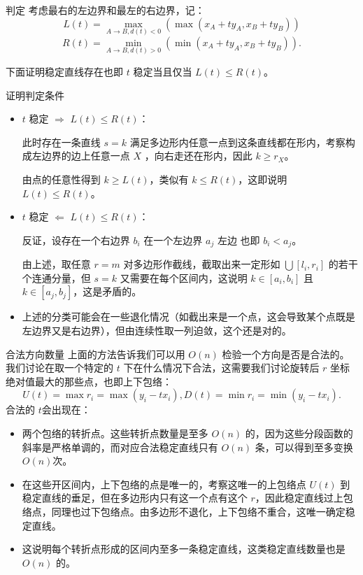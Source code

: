 \documentclass{beamer}
\begin{document}
{{\begin{frame}{判定}
  考虑最右的左边界和最左的右边界，记：
  \[
    L(t) = \max_{A \rightarrow B, d(t) < 0}(\max(x_A + ty_A, x_B + ty_B)) 
  \]
  \[
    R(t) = \min_{A \rightarrow B, d(t) > 0}(\min(x_A + ty_A, x_B + ty_B)).
  \]

  下面证明稳定直线存在也即 $t$ 稳定当且仅当 $L(t) \le R(t)$。
\end{frame}

\begin{frame}{证明判定条件}
  \begin{itemize}
    \item $t$ 稳定 $\Rightarrow$ $L(t) \le R(t)$：

    此时存在一条直线 $s = k$ 满足多边形内任意一点到这条直线都在形内，考察构成左边界的边上任意一点 $X$ ，向右走还在形内，因此 $k \ge r_X$。
    
    由点的任意性得到 $k \ge L(t)$，类似有 $k \le R(t)$，这即说明 $L(t) \le R(t)$。
    \item $t$ 稳定 $\Leftarrow$ $L(t) \le R(t)$：
   
     反证，设存在一个右边界 $b_i$ 在一个左边界 $a_j$ 左边 也即 $b_i  < a_j$。

     由上述，取任意 $r = m$ 对多边形作截线，截取出来一定形如 $\bigcup [l_i, r_i]$ 的若干个连通分量，但 $s = k$ 又需要在每个区间内，这说明 $k \in [a_i, b_i]$ 且 $k \in [a_j, b_j]$，这是矛盾的。
     \item 上述的分类可能会在一些退化情况（如截出来是一个点，这会导致某个点既是左边界又是右边界），但由连续性取一列迫敛，这个还是对的。
  \end{itemize}
\end{frame}

\begin{frame}{合法方向数量}
  上面的方法告诉我们可以用 $O(n)$ 检验一个方向是否是合法的。
  我们讨论在取一个特定的 $t$ 下在什么情况下合法，这需要我们讨论旋转后 $r$ 坐标绝对值最大的那些点，也即上下包络：
  \[
    U(t) = \max{r_i} = \max(y_i - tx_i), D(t) = \min{r_i} = \min(y_i - tx_i).
  \]
  合法的 $t$会出现在：
  \begin{itemize}
    \item 两个包络的转折点。这些转折点数量是至多 $O(n)$ 的，因为这些分段函数的斜率是严格单调的，而对应合法稳定直线只有 $O(n)$ 条，可以得到至多变换 $O(n)$次。
    \item 在这些开区间内，上下包络的点是唯一的，考察这唯一的上包络点 $U(t)$ 到稳定直线的垂足，但在多边形内只有这一个点有这个 $r$，因此稳定直线过上包络点，同理也过下包络点。由多边形不退化，上下包络不重合，这唯一确定稳定直线。
    \item 这说明每个转折点形成的区间内至多一条稳定直线，这类稳定直线数量也是 $O(n)$ 的。
  \end{itemize}
\end{frame}

}}
\end{document}
